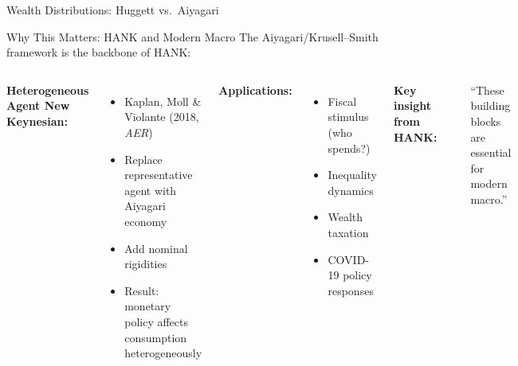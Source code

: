 \documentclass[aspectratio=169,11pt]{beamer}
\newcommand{\emphc}[1]{\textcolor{harvardcrimson}{#1}}
\begin{document}
\begin{frame}{Wealth Distributions: Huggett vs.\ Aiyagari}
\end{frame}

\begin{frame}[shrink=2]{Why This Matters: HANK and Modern Macro}
\small
The Aiyagari/Krusell--Smith framework is the \emphc{backbone of HANK}:

\vspace{0.1em}
\begin{columns}[T]
\textbf{Heterogeneous Agent New Keynesian:}
\begin{itemize}\itemsep2pt
    \item Kaplan, Moll \& Violante (2018, \emph{AER})
    \item Replace representative agent with Aiyagari economy
    \item Add nominal rigidities
    \item Result: monetary policy affects consumption \emphc{heterogeneously}
\end{itemize}

\vspace{0.3em}
\textbf{Applications:}
\begin{itemize}\itemsep2pt
    \item Fiscal stimulus (who spends?)
    \item Inequality dynamics
    \item Wealth taxation
    \item COVID-19 policy responses
\end{itemize}

\textbf{Key insight from HANK:}

\vspace{0.2em}
\begin{center}
\end{center}

\vspace{0.1em}
{\scriptsize ``These building blocks are essential for modern macro.''}
\end{columns}
\end{frame}
\end{document}
